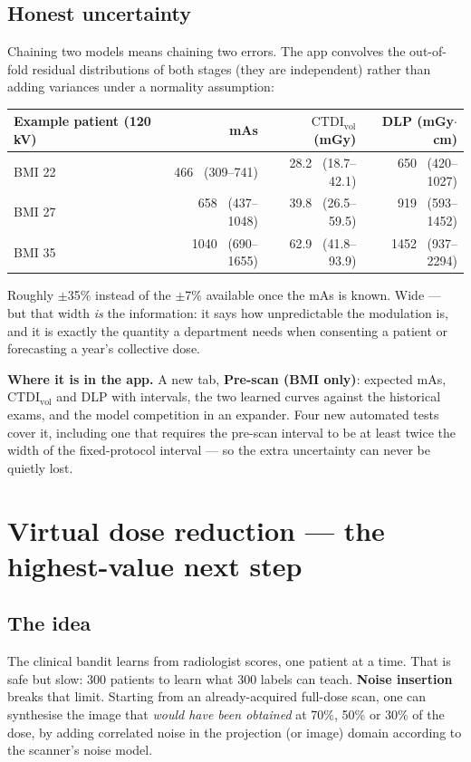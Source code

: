\documentclass[10pt,a4paper]{article}
\newcommand{\ctdi}{\ensuremath{\mathrm{CTDI}_{\mathrm{vol}}}}
\newcommand{\mgycm}{mGy$\cdot$cm}
\newcommand{\hdr}{\rowcolor{ctsurf}}
\begin{document}
\subsection{Honest uncertainty}
Chaining two models means chaining two errors. The app convolves the out-of-fold residual distributions of both
stages (they are independent) rather than adding variances under a normality assumption:

\begin{table}[h]\footnotesize
\begin{tabularx}{\linewidth}{@{}L r r r@{}}
\toprule
\hdr \textbf{Example patient (120 kV)} & \textbf{mAs} & \textbf{\ctdi{} (mGy)} & \textbf{DLP (\mgycm)}\\
\midrule
BMI 22 & 466 \ (309--741) & 28.2 \ (18.7--42.1) & 650 \ (420--1027)\\
BMI 27 & 658 \ (437--1048) & 39.8 \ (26.5--59.5) & 919 \ (593--1452)\\
BMI 35 & 1040 \ (690--1655) & 62.9 \ (41.8--93.9) & 1452 \ (937--2294)\\
\bottomrule
\end{tabularx}
\end{table}

\noindent Roughly $\pm$35\% instead of the $\pm$7\% available once the mAs is known. Wide --- but that width
\textit{is} the information: it says how unpredictable the modulation is, and it is exactly the quantity a
department needs when consenting a patient or forecasting a year's collective dose.

\begin{safebox}
\textbf{Where it is in the app.} A new tab, \textbf{Pre-scan (BMI only)}: expected mAs, \ctdi{} and DLP with
intervals, the two learned curves against the historical exams, and the model competition in an expander. Four new
automated tests cover it, including one that requires the pre-scan interval to be at least twice the width of the
fixed-protocol interval --- so the extra uncertainty can never be quietly lost.
\end{safebox}

\section{Virtual dose reduction --- the highest-value next step}

\subsection{The idea}
The clinical bandit learns from radiologist scores, one patient at a time. That is safe but slow: 300 patients to
learn what 300 labels can teach. \textbf{Noise insertion} breaks that limit. Starting from an already-acquired
full-dose scan, one can synthesise the image that \textit{would have been obtained} at 70\%, 50\% or 30\% of the
dose, by adding correlated noise in the projection (or image) domain according to the scanner's noise model.
\end{document}

